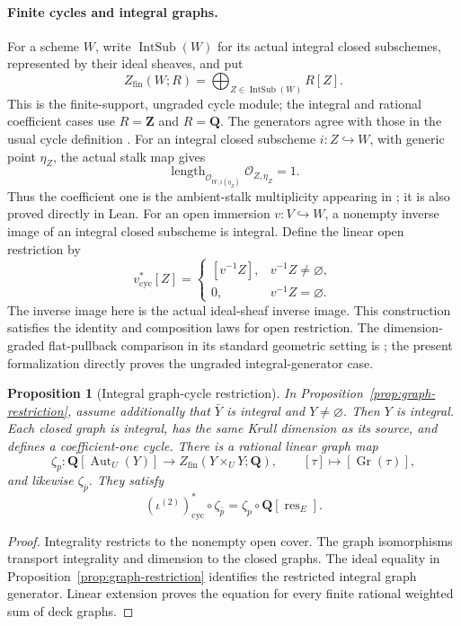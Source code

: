 \documentclass[11pt]{article}
\newtheorem{proposition}[theorem]{Proposition}
\theoremstyle{definition}
\theoremstyle{remark}
\newcommand{\Q}{\mathbf Q}
\begin{document}
\paragraph{Finite cycles and integral graphs.}
For a scheme \(W\), write \(\operatorname{IntSub}(W)\) for its actual
integral closed subschemes, represented by their ideal sheaves, and put
\[
  Z_{\mathrm{fin}}(W;R)
    =\bigoplus_{Z\in\operatorname{IntSub}(W)}R[Z].
\]
This is the finite-support, ungraded cycle module; the integral and rational
coefficient cases use \(R=\mathbf Z\) and \(R=\Q\). The generators agree
with those in the usual cycle definition \cite{StacksCycles}. For an integral
closed subscheme \(i:Z\hookrightarrow W\), with generic point \(\eta_Z\),
the actual stalk map gives
\[
  \operatorname{length}_{\mathcal O_{W,i(\eta_Z)}}
    \mathcal O_{Z,\eta_Z}=1.
\]
Thus the coefficient one is the ambient-stalk multiplicity appearing in
\cite{StacksFundamentalCycle}; it is also proved directly in Lean.
For an open immersion \(v:V\hookrightarrow W\), a nonempty inverse image of an integral
closed subscheme is integral. Define the linear open restriction by
\[
  v^*_{\mathrm{cyc}}[Z]=
  \begin{cases}
    [v^{-1}Z],&v^{-1}Z\ne\varnothing,\\
    0,&v^{-1}Z=\varnothing.
  \end{cases}
\]
The inverse image here is the actual ideal-sheaf inverse image.
This construction satisfies the identity and composition laws for open
restriction. The dimension-graded flat-pullback comparison in its standard
geometric setting is \cite{StacksFundamentalCyclePullback}; the present
formalization directly proves the ungraded integral-generator case.

\begin{proposition}[Integral graph-cycle restriction]
\label{prop:graph-cycle-restriction}
In Proposition~\ref{prop:graph-restriction}, assume additionally that
\(\bar Y\) is integral and \(Y\ne\varnothing\). Then \(Y\) is integral.
Each closed graph is integral, has the same Krull dimension as its source,
and defines a coefficient-one cycle. There is a rational linear graph map
\[
  \zeta_p:\Q[\operatorname{Aut}_U(Y)]
    \longrightarrow Z_{\mathrm{fin}}(Y\times_UY;\Q),
  \qquad [\tau]\longmapsto[\operatorname{Gr}(\tau)],
\]
and likewise \(\zeta_{\bar p}\). They satisfy
\[
  (\iota^{(2)})^*_{\mathrm{cyc}}\circ\zeta_{\bar p}
    =\zeta_p\circ\Q[\operatorname{res}_E].
\]
\end{proposition}

\begin{proof}
Integrality restricts to the nonempty open cover. The graph isomorphisms
transport integrality and dimension to the closed graphs. The ideal
equality in Proposition~\ref{prop:graph-restriction} identifies the
restricted integral graph generator. Linear extension proves the equation
for every finite rational weighted sum of deck graphs.
\end{proof}
\end{document}
